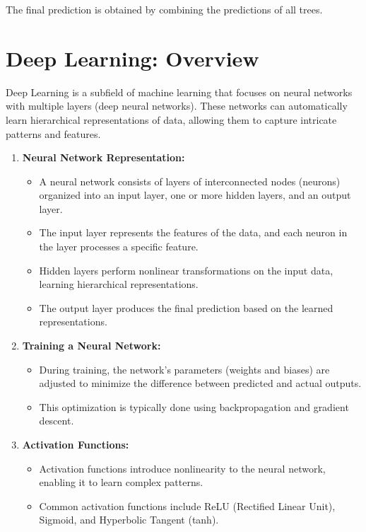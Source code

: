 \documentclass[12pt]{article}
\begin{document}
The final prediction is obtained by combining the predictions of all trees.

\section{Deep Learning: Overview}

Deep Learning is a subfield of machine learning that focuses on neural networks with multiple layers (deep neural networks). These networks can automatically learn hierarchical representations of data, allowing them to capture intricate patterns and features.

\begin{enumerate}
    \item \textbf{Neural Network Representation:}
        \begin{itemize}
            \item A neural network consists of layers of interconnected nodes (neurons) organized into an input layer, one or more hidden layers, and an output layer.
            \item The input layer represents the features of the data, and each neuron in the layer processes a specific feature.
            \item Hidden layers perform nonlinear transformations on the input data, learning hierarchical representations.
            \item The output layer produces the final prediction based on the learned representations.
        \end{itemize}
    
    \item \textbf{Training a Neural Network:}
        \begin{itemize}
            \item During training, the network's parameters (weights and biases) are adjusted to minimize the difference between predicted and actual outputs.
            \item This optimization is typically done using backpropagation and gradient descent.
        \end{itemize}
    
    \item \textbf{Activation Functions:}
        \begin{itemize}
            \item Activation functions introduce nonlinearity to the neural network, enabling it to learn complex patterns.
            \item Common activation functions include ReLU (Rectified Linear Unit), Sigmoid, and Hyperbolic Tangent (tanh).
        \end{itemize}
    

\end{enumerate}
\end{document}
